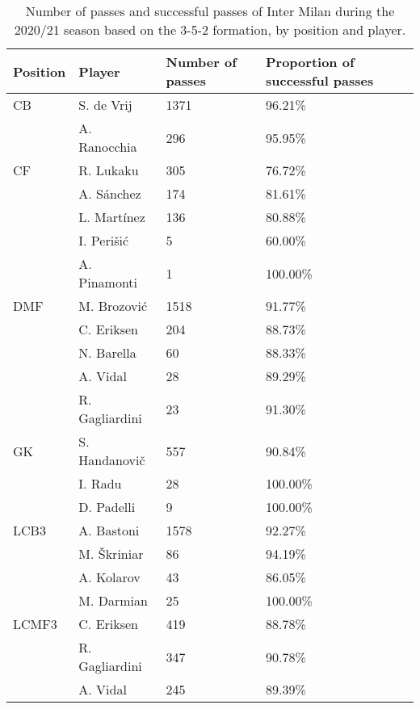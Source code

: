 \begin{table}[!htbp]
\centering
\caption{Number of passes and successful passes of Inter Milan during the 2020/21 season based on the 3-5-2 formation,
by position and player.}\s
\scriptsize
\begin{tabular}{@{}llll@{}}
\hline
Position & Player   & Number of passes & Proportion of successful passes \\ \midrule
CB               & S. de Vrij     & 1371        & 96.21\%  \\
               & A. Ranocchia   & 296         & 95.95\%  \\
CF               & R. Lukaku      & 305         & 76.72\%  \\
               & A. Sánchez     & 174         & 81.61\%  \\
               & L. Martínez    & 136         & 80.88\%  \\
               & I. Perišić     & 5           & 60.00\%  \\
               & A. Pinamonti   & 1           & 100.00\% \\
DMF              & M. Brozović    & 1518        & 91.77\%  \\
              & C. Eriksen     & 204         & 88.73\%  \\
             & N. Barella     & 60          & 88.33\%  \\
              & A. Vidal       & 28          & 89.29\%  \\
              & R. Gagliardini & 23          & 91.30\%  \\
GK               & S. Handanovič  & 557         & 90.84\%  \\
             & I. Radu        & 28          & 100.00\% \\
             & D. Padelli     & 9           & 100.00\% \\
LCB3             & A. Bastoni     & 1578        & 92.27\%  \\
             & M. Škriniar    & 86          & 94.19\%  \\
             & A. Kolarov     & 43          & 86.05\%  \\
             & M. Darmian     & 25          & 100.00\% \\
LCMF3            & C. Eriksen     & 419         & 88.78\%  \\
            & R. Gagliardini & 347         & 90.78\%  \\
            & A. Vidal       & 245         & 89.39\%  \\

\end{tabular}
\end{table}
